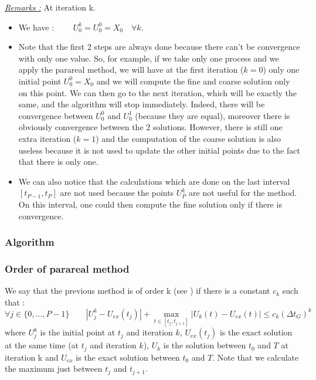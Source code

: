 \noindent \underline{\textit{Remarks :}} At iteration k.
\begin{itemize}[label=-]
	\item We have : $\qquad U_0^k=U_0^0=X_0 \quad \forall k$.
	\item Note that the first 2 steps are always done because there can't be convergence with only one value. So, for example, if we take only one process and we apply the parareal method, we will have at the first iteration ($k=0$) only one initial point $U_0^0=X_0$ and we will compute the fine and coarse solution only on this point. We can then go to the next iteration, which will be exactly the same, and the algorithm will stop immediately. Indeed, there will be convergence between $U_0^0$ and $U_0^1$ (because they are equal), moreover there is obviously convergence between the 2 solutions. However, there is still one extra iteration ($k=1$) and the computation of the coarse solution is also useless because it is not used to update the other initial points due to the fact that there is only one.
	\item We can also notice that the calculations which are done on the last interval $[t_{P-1},t_P]$ are not used because the points $U_P^k$ are not useful for the method. On this interval, one could then compute the fine solution only if there is convergence.
\end{itemize}

\subsubsection{Algorithm}


\subsubsection{Order of parareal method}

We say that the previous method is of order k (see \cite{partie2_ref2}) if there is a constant $c_k$ such that :
\begin{equation}
	\forall j\in\{0,\dots,P-1\} \qquad |U_j^k-U_{ex}(t_j)|+\max_{t\in[t_j,t_{j+1}]}|U_k(t)-U_{ex}(t)|\le c_k(\Delta t_G)^k
\end{equation}
where $U_j^k$ is the initial point at $t_j$ and iteration $k$, $U_{ex}(t_j)$ is the exact solution at the same time (at $t_j$ and iteration $k$), $U_k$ is the solution between $t_0$ and $T$ at iteration k and $U_{ex}$ is the exact solution between $t_0$ and $T$. Note that we calculate the maximum just between $t_j$ and $t_{j+1}$. \\

